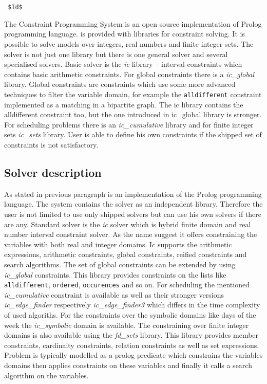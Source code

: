 \section{\eclipse}
\verb= $Id$ =

The \eclipse Constraint Programming System is an open source implementation of 
Prolog programming language. \eclipse is provided with libraries for constraint 
solving. It is possible to solve models over integers, real numbers and finite 
integer sets. The solver is not just one library but there is one general solver 
and several specialised solvers. Basic solver is the {\em ic} library -- interval 
constraints which contains basic arithmetic constraints. For global constraints there 
is a {\em ic\_global} library. Global constraints are constraints
which use some more advanced techniques to filter the variable domain, for example 
the \texttt{alldifferent} constraint implemented as a matching in a bipartite graph.
The ic library contains the alldifferent constraint too, but the one introduced in
ic\_global library is stronger. For scheduling problems there is an {\em ic\_cumulative}
library and for finite integer sets {\em ic\_sets} library. User is able to define his own
constraints if the shipped set of constraints is not satisfactory.

\subsection{Solver description}
As stated in previous paragraph \eclipse is an implementation of the Prolog programming language.
The system contains the solver as an independent library. Therefore the user is not 
limited to use only shipped solvers but can use his own solvers if there are any.
Standard solver is the {\em ic} solver which is hybrid finite domain and real number 
interval constraint solver. As the name suggest it offers constraining the variables with
both real and integer domains. Ic supports the arithmetic expressions, arithmetic constraints,
global constraints, reified constraints and search algorithms. The set of global constraints
can be extended by using {\em ic\_global} constraints. This library provides constraints
on the lists like \texttt{alldifferent}, \texttt{ordered}, \texttt{occurences} and so on.
For scheduling the mentioned {\em ic\_cumulative} constraint is available as well as 
their stronger versions {\em ic\_edge\_finder} respectively {\em ic\_edge\_finder3} which
differs in the time complexity of used algoriths. For the constraints over the symbolic 
domains like days of the week the {\em ic\_symbolic} domain is available.  The 
constraining over finite integer domains is also available using the {\em fd\_sets} library.
This library provides member constraints, cardinaity constraints, relation constraints
as well as set expressions. Problem is typically modelled as a prolog predicate which constrains the variables domains
then applies constraints on these variables and finally it calls a search algorithm 
on the variables. 

